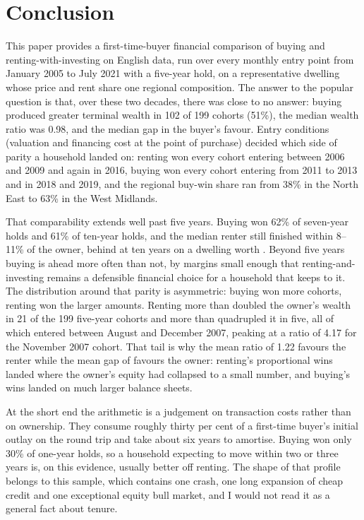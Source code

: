 
\section{Conclusion}
\label{sec:conclusion}

This paper provides a first-time-buyer financial comparison of buying and renting-with-investing on English data, run over every monthly entry point from January 2005 to July 2021 with a five-year hold, on a representative dwelling whose price and rent share one regional composition. The answer to the popular question is that, over these two decades, there was close to no answer: buying produced greater terminal wealth in 102 of 199 cohorts (51\%), the median wealth ratio was 0.98, and the median gap  in the buyer's favour. Entry conditions (valuation and financing cost at the point of purchase) decided which side of parity a household landed on: renting won every cohort entering between 2006 and 2009 and again in 2016, buying won every cohort entering from 2011 to 2013 and in 2018 and 2019, and the regional buy-win share ran from 38\% in the North East to 63\% in the West Midlands.

That comparability extends well past five years. Buying won 62\% of seven-year holds and 61\% of ten-year holds, and the median renter still finished within 8--11\% of the owner,  behind at ten years on a dwelling worth . Beyond five years buying is ahead more often than not, by margins small enough that renting-and-investing remains a defensible financial choice for a household that keeps to it. The distribution around that parity is asymmetric: buying won more cohorts, renting won the larger amounts. Renting more than doubled the owner's wealth in 21 of the 199 five-year cohorts and more than quadrupled it in five, all of which entered between August and December 2007, peaking at a ratio of 4.17 for the November 2007 cohort. That tail is why the mean ratio of 1.22 favours the renter while the mean gap of  favours the owner: renting's proportional wins landed where the owner's equity had collapsed to a small number, and buying's wins landed on much larger balance sheets.

At the short end the arithmetic is a judgement on transaction costs rather than on ownership. They consume roughly thirty per cent of a first-time buyer's initial outlay on the round trip and take about six years to amortise. Buying won only 30\% of one-year holds, so a household expecting to move within two or three years is, on this evidence, usually better off renting. The shape of that profile belongs to this sample, which contains one crash, one long expansion of cheap credit and one exceptional equity bull market, and I would not read it as a general fact about tenure.

